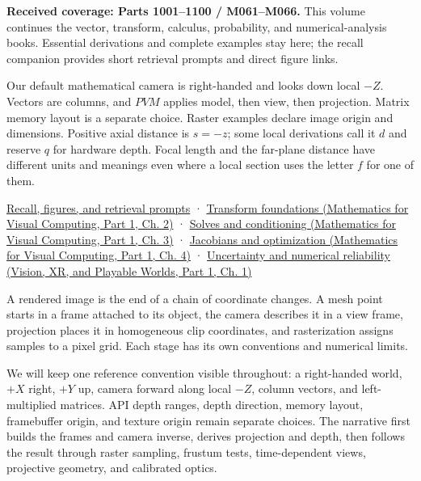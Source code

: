 \hypertarget{02-foundations-ii-ch032-from-coordinate-frames-to-camera-images-projective-geometry-and-cameras}{}

\textbf{Received coverage: Parts 1001--1100 / M061--M066.} This volume continues the vector, transform, calculus, probability, and numerical-analysis books. Essential derivations and complete examples stay here; the recall companion provides short retrieval prompts and direct figure links.

Our default mathematical camera is right-handed and looks down local \(-Z\). Vectors are columns, and \(PVM\) applies model, then view, then projection. Matrix memory layout is a separate choice. Raster examples declare image origin and dimensions. Positive axial distance is \(s=-z\); some local derivations call it \(d\) and reserve \(q\) for hardware depth. Focal length and the far-plane distance have different units and meanings even where a local section uses the letter \(f\) for one of them.

\hyperref[appendix-a2b71a18f5a2]{Recall, figures, and retrieval prompts} · \href{../02-Mathematics-for-Visual-Computing-P01/main.pdf\#nameddest=01-foundations-i-ch018-keep-the-promises-visible-while-moving-between-representations}{Transform foundations (Mathematics for Visual Computing, Part 1, Ch. 2)} · \href{../02-Mathematics-for-Visual-Computing-P01/main.pdf\#nameddest=01-foundations-i-ch019-the-graphics-problem-hiding-inside-a-matrix-equation}{Solves and conditioning (Mathematics for Visual Computing, Part 1, Ch. 3)} · \href{../02-Mathematics-for-Visual-Computing-P01/main.pdf\#nameddest=01-foundations-i-ch020-functions-limits-continuity-and-scalar-change}{Jacobians and optimization (Mathematics for Visual Computing, Part 1, Ch. 4)} · \href{../07-Vision-XR-and-Playable-Worlds-P01/main.pdf\#nameddest=02-foundations-ii-ch039-learning-route}{Uncertainty and numerical reliability (Vision, XR, and Playable Worlds, Part 1, Ch. 1)}

A rendered image is the end of a chain of coordinate changes. A mesh point starts in a frame attached to its object, the camera describes it in a view frame, projection places it in homogeneous clip coordinates, and rasterization assigns samples to a pixel grid. Each stage has its own conventions and numerical limits.

We will keep one reference convention visible throughout: a right-handed world, \(+X\) right, \(+Y\) up, camera forward along local \(-Z\), column vectors, and left-multiplied matrices. API depth ranges, depth direction, memory layout, framebuffer origin, and texture origin remain separate choices. The narrative first builds the frames and camera inverse, derives projection and depth, then follows the result through raster sampling, frustum tests, time-dependent views, projective geometry, and calibrated optics.

